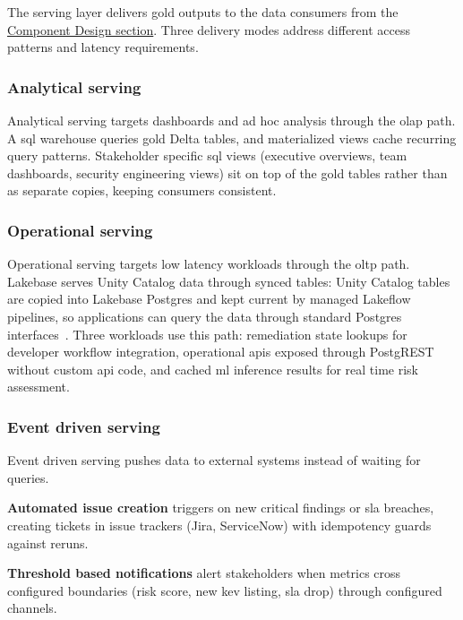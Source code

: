 The serving layer delivers gold outputs to the data consumers from the \hyperref[sec:component-design]{Component Design section}. Three delivery modes address different access patterns and latency requirements.

\subsubsection{Analytical serving}

Analytical serving targets dashboards and ad hoc analysis through the \gls{olap} path. A \gls{sql} warehouse queries gold Delta tables, and materialized views cache recurring query patterns. Stakeholder specific \gls{sql} views (executive overviews, team dashboards, security engineering views) sit on top of the gold tables rather than as separate copies, keeping consumers consistent.

\subsubsection{Operational serving}

Operational serving targets low latency workloads through the \gls{oltp} path. Lakebase serves Unity Catalog data through synced tables: Unity Catalog tables are copied into Lakebase Postgres and kept current by managed Lakeflow pipelines, so applications can query the data through standard Postgres interfaces~\cite{DatabricksLakebaseSyncTables2026}. Three workloads use this path: remediation state lookups for developer workflow integration, operational \glspl{api} exposed through PostgREST without custom \gls{api} code, and cached \gls{ml} inference results for real time risk assessment.

\subsubsection{Event driven serving}

Event driven serving pushes data to external systems instead of waiting for queries.

\textbf{Automated issue creation} triggers on new critical findings or \gls{sla} breaches, creating tickets in issue trackers (Jira, ServiceNow) with idempotency guards against reruns.

\textbf{Threshold based notifications} alert stakeholders when metrics cross configured boundaries (risk score, new \gls{kev} listing, \gls{sla} drop) through configured channels.

